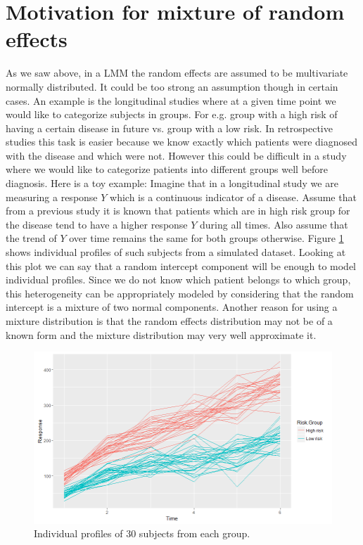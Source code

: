 \section{Motivation for mixture of random effects}
As we saw above, in a LMM the random effects are assumed to be multivariate normally distributed. It could be too strong an assumption though in certain cases. An example is the longitudinal studies where at a given time point we would like to categorize subjects in groups. For e.g. group with a high risk of having a certain disease in future vs. group with a low risk. In retrospective studies this task is easier because we know exactly which patients were diagnosed with the disease and which were not. However this could be difficult in a study where we would like to categorize patients into different groups well before diagnosis. Here is a toy example: Imagine that in a longitudinal study we are measuring a response $Y$ which is a continuous indicator of a disease. Assume that from a previous study it is known that patients which are in high risk group for the disease tend to have a higher response $Y$ during all times. Also assume that the trend of $Y$ over time remains the same for both groups otherwise. Figure \ref{fig : random_slope_dummy_data} shows individual profiles of such subjects from a simulated dataset. Looking at this plot we can say that a random intercept component will be enough to model individual profiles. Since we do not know which patient belongs to which group, this heterogeneity can be appropriately modeled by considering that the random intercept is a mixture of two normal components. Another reason for using a mixture distribution is that the random effects distribution may not be of a known form and the mixture distribution may very well approximate it.\\

\begin{figure}
	\centering
	\captionsetup{justification=centering}
	\includegraphics[scale=0.5]{mainmatter/chapter_3_blmm/random_slope_dummy_data.png}
	\caption{Individual profiles of 30 subjects from each group.}
	\label{fig : random_slope_dummy_data}
\end{figure}

